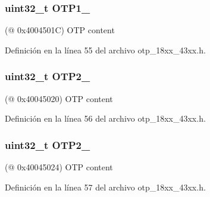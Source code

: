 \subsubsection[{\texorpdfstring{O\+T\+P1\+\_\+3}{OTP1_3}}]{ uint32\+\_\+t O\+T\+P1\+\_}\hypertarget{struct_l_p_c___o_t_p___t_a11e4d14773e1237874863e191a627e4e}{}\label{struct_l_p_c___o_t_p___t_a11e4d14773e1237874863e191a627e4e}
(@ 0x4004501C) O\+TP content 

Definición en la línea 55 del archivo otp\+\_\+18xx\+\_\+43xx.\+h.

\subsubsection[{\texorpdfstring{O\+T\+P2\+\_\+0}{OTP2_0}}]{ uint32\+\_\+t O\+T\+P2\+\_}\hypertarget{struct_l_p_c___o_t_p___t_a0670ccc03779f75566481b736c921990}{}\label{struct_l_p_c___o_t_p___t_a0670ccc03779f75566481b736c921990}
(@ 0x40045020) O\+TP content 

Definición en la línea 56 del archivo otp\+\_\+18xx\+\_\+43xx.\+h.

\subsubsection[{\texorpdfstring{O\+T\+P2\+\_\+1}{OTP2_1}}]{ uint32\+\_\+t O\+T\+P2\+\_}\hypertarget{struct_l_p_c___o_t_p___t_ab63df09dc1a83420a8498f97d355336c}{}\label{struct_l_p_c___o_t_p___t_ab63df09dc1a83420a8498f97d355336c}
(@ 0x40045024) O\+TP content 

Definición en la línea 57 del archivo otp\+\_\+18xx\+\_\+43xx.\+h.

